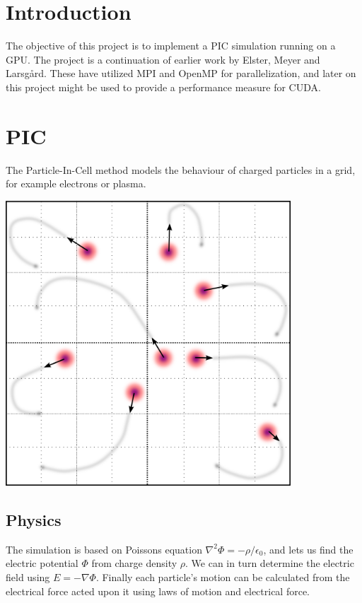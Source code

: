 \documentclass[10pt,a4paper,twocolumns]{article}
\newenvironment{Figure}
	{\par\medskip\noindent\minipage{\linewidth}}
	{\endminipage\par\medskip}
\begin{document}
	\begin{multicols*}{2}
		\section*{Introduction}
		 The objective of this project is to implement a PIC simulation
		 running on a GPU. The project is a continuation of earlier work
		 by Elster, Meyer and Larsgård. These have utilized MPI and
		 OpenMP for parallelization, and later on this project might
		 be used to provide a performance measure for CUDA.
		 
		\section*{PIC}
		\begin{multicols*}{2}
			The Particle-In-Cell method models the behaviour of charged
			particles in a grid, for example electrons or plasma.
			
			\begin{Figure}
				\center
				\includegraphics[width=0.8\textwidth]{pic_illustration.png}
				\label{fig:illustration}
			\end{Figure}
		\end{multicols*}
		
		\subsection*{Physics}
		The simulation is based on Poissons equation $\nabla^2\Phi=-\rho/\epsilon_0$,
		and lets us find the electric potential $\Phi$ from charge density $\rho$.
		We can in turn determine the electric field using $E=-\nabla\Phi$. Finally
		each particle's motion can be calculated from the electrical
		force acted upon it using laws of motion and electrical force.
		

\end{multicols*}
\end{document}

